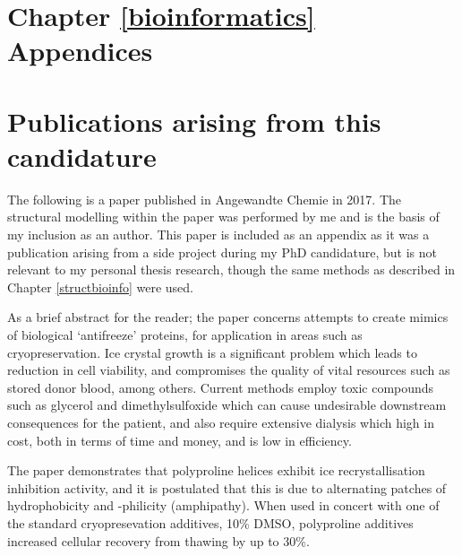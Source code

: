\documentclass[a4paper, oneside, 11pt]{report} %
\begin{document}
\begin{appendices}

\chapter{Chapter \ref{bioinformatics} Appendices}\label{bioinformatics_appendix}
%
%
%
%

\chapter{Publications arising from this candidature}\label{publications}
The following is a paper published in Angewandte Chemie in 2017. The structural modelling within the paper was performed by me and is the basis of my inclusion as an author. This paper is included as an appendix as it was a publication arising from a side project during my PhD candidature, but is not relevant to my personal thesis research, though the same methods as described in Chapter \ref{structbioinfo} were used.

As a brief abstract for the reader; the paper concerns attempts to create mimics of biological `antifreeze' proteins, for application in areas such as cryopreservation. Ice crystal growth is a significant problem which leads to reduction in cell viability, and compromises the quality of vital resources such as stored donor blood, among others. Current methods employ toxic compounds such as glycerol and dimethylsulfoxide which can cause undesirable downstream consequences for the patient, and also require extensive dialysis which high in cost, both in terms of time and money, and is low in efficiency.

The paper demonstrates that polyproline helices exhibit ice recrystallisation inhibition activity, and it is postulated that this is due to alternating patches of hydrophobicity and -philicity (amphipathy). When used in concert with one of the standard cryopresevation additives, 10\% DMSO, polyproline additives increased cellular recovery from thawing by up to 30\%.



\end{appendices}
\end{document}
